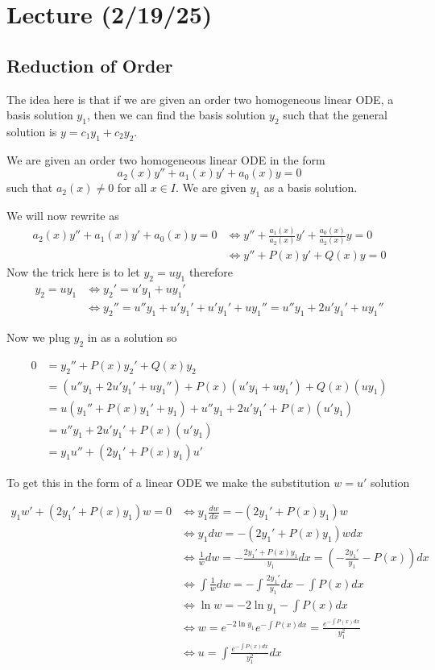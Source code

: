 \documentclass[notes]{subfiles}
\begin{document}
\setcounter{section}{9}
\section{Lecture (2/19/25)}
\subsection{Reduction of Order}
The idea here is that if we are given an order two homogeneous linear ODE, a basis solution $y_1$, then we can find the basis solution $y_2$ such that the general solution is $y = c_1y_1 + c_2y_2$.

We are given an order two homogeneous linear ODE in the form
\[
    a_2(x)y'' + a_1(x)y' + a_0(x)y = 0
\]
such that $a_2(x) \neq 0$ for all $x \in I$. We are given $y_1$ as a basis solution.

We will now rewrite as
\begin{align*}
    a_2(x)y'' + a_1(x)y' + a_0(x)y = 0
    &\iff y'' + \frac{a_1(x)}{a_2(x)}y' + \frac{a_0(x)}{a_2(x)}y = 0 \\
    &\iff y'' + P(x)y' + Q(x)y = 0
\end{align*}
Now the trick here is to let $y_2 = uy_1$ therefore
\begin{align*}
    y_2 = uy_1
    &\iff y_2' = u'y_1 + uy_1' \\
    &\iff y_2'' = u''y_1 + u'y_1' + u'y_1' + uy_1'' = u''y_1 + 2u'y_1' + uy_1'' %
\end{align*}

Now we plug $y_2$ in as a solution so

\begin{align*}
    0
    &= y_2'' + P(x)y_2' + Q(x)y_2 \\
    &= (u''y_1 + 2u'y_1' + uy_1'') + P(x)(u'y_1 + uy_1') + Q(x)(uy_1) \\
    &= u(y_1'' + P(x)y_1' + y_1) + u''y_1 + 2u'y_1' + P(x)(u'y_1) \\
    &= u''y_1 + 2u'y_1' + P(x)(u'y_1) \\
    &= y_1u'' + (2y_1' + P(x)y_1)u'
\end{align*}

To get this in the form of a linear ODE we make the substitution $w = u'$ solution

\begin{align*}
    y_1w' + (2y_1' + P(x)y_1)w = 0
    &\iff y_1\frac{dw}{dx} = -(2y_1' + P(x)y_1)w \\
    &\iff y_1dw = -(2y_1' + P(x)y_1)wdx \\
    &\iff \frac{1}{w}dw = -\frac{2y_1' + P(x)y_1}{y_1}dx = \left( -\frac{2y_1'}{y_1} - P(x) \right)dx \\
    &\iff \int \frac{1}{w}dw = -\int \frac{2y_1'}{y_1}dx - \int P(x)dx \\
    &\iff \ln w = -2\ln y_1 - \int P(x)dx \\
    &\iff w = e^{-2\ln y_1}e^{-\int P(x)dx} = \frac{e^{-\int P(x)dx}}{y_1^2} \\
    &\iff u = \int \frac{e^{-\int P(x)dx}}{y_1^2} dx
\end{align*}
\end{document}

